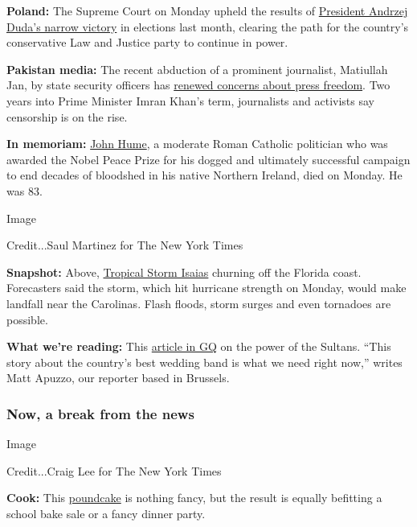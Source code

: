\textbf{Poland:} The Supreme Court on Monday upheld the results of
\href{https://www.nytimes3xbfgragh.onion/2020/08/03/world/europe/poland-court-presidential-election.html}{President
Andrzej Duda's narrow victory} in elections last month, clearing the
path for the country's conservative Law and Justice party to continue in
power.

\textbf{Pakistan media:} The recent abduction of a prominent journalist,
Matiullah Jan, by state security officers has
\href{https://www.nytimes3xbfgragh.onion/2020/08/03/world/asia/pakistan-media-abductions.html}{renewed
concerns about press freedom}. Two years into Prime Minister Imran
Khan's term, journalists and activists say censorship is on the rise.

\textbf{In memoriam:}
\href{https://www.nytimes3xbfgragh.onion/2020/08/03/obituaries/john-hume-dies.html}{John
Hume}, a moderate Roman Catholic politician who was awarded the Nobel
Peace Prize for his dogged and ultimately successful campaign to end
decades of bloodshed in his native Northern Ireland, died on Monday. He
was 83.

Image

Credit...Saul Martinez for The New York Times

\textbf{Snapshot:} Above,
\href{https://www.nytimes3xbfgragh.onion/2020/08/03/us/isaias-storm-updates.html\#link-17297d4d}{Tropical
Storm Isaias} churning off the Florida coast. Forecasters said the
storm, which hit hurricane strength on Monday, would make landfall near
the Carolinas. Flash floods, storm surges and even tornadoes are
possible.

\textbf{What we're reading:} This
\href{https://www.gq.com/story/americas-best-wedding-band-the-sultans}{article
in GQ} on the power of the Sultans. ``This story about the country's
best wedding band is what we need right now,'' writes Matt Apuzzo, our
reporter based in Brussels.

\hypertarget{now-a-break-from-the-news}{%
\subsubsection{Now, a break from the
news}\label{now-a-break-from-the-news}}

Image

Credit...Craig Lee for The New York Times

\textbf{Cook:} This
\href{https://cooking.nytimes3xbfgragh.onion/recipes/12194-field-day-poundcake}{poundcake}
is nothing fancy, but the result is equally befitting a school bake sale
or a fancy dinner party.

